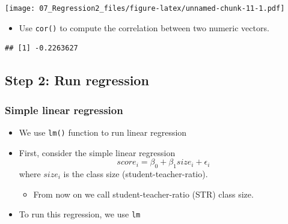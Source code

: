 \documentclass[]{book}
\newenvironment{Shaded}{\begin{snugshade}}{\end{snugshade}}
\newcommand{\KeywordTok}[1]{\textcolor[rgb]{0.13,0.29,0.53}{\textbf{#1}}}
\newcommand{\DataTypeTok}[1]{\textcolor[rgb]{0.13,0.29,0.53}{#1}}
\newcommand{\StringTok}[1]{\textcolor[rgb]{0.31,0.60,0.02}{#1}}
\newcommand{\CommentTok}[1]{\textcolor[rgb]{0.56,0.35,0.01}{\textit{#1}}}
\newcommand{\OperatorTok}[1]{\textcolor[rgb]{0.81,0.36,0.00}{\textbf{#1}}}
\newcommand{\NormalTok}[1]{#1}
\providecommand{\tightlist}{%
  \setlength{\itemsep}{0pt}\setlength{\parskip}{0pt}}
\begin{document}
\texttt{[image: 07\_Regression2\_files/figure-latex/unnamed-chunk-11-1.pdf]}

\begin{itemize}
\tightlist
\item
  Use \texttt{cor()} to compute the correlation between two numeric
  vectors.
\end{itemize}

\begin{Shaded}
\end{Shaded}

\begin{verbatim}
## [1] -0.2263627
\end{verbatim}

\subsection{Step 2: Run regression}\label{step-2-run-regression}

\subsubsection{Simple linear regression}\label{simple-linear-regression}

\begin{itemize}
\tightlist
\item
  We use \texttt{lm()} function to run linear regression
\item
  First, consider the simple linear regression \[
  score_i = \beta_0 + \beta_1 size_i + \epsilon_i
  \] where \(size_i\) is the class size (student-teacher-ratio).

  \begin{itemize}
  \tightlist
  \item
    From now on we call student-teacher-ratio (STR) class size.
  \end{itemize}
\item
  To run this regression, we use \texttt{lm}
\end{itemize}

\begin{Shaded}
\end{Shaded}
\end{document}
